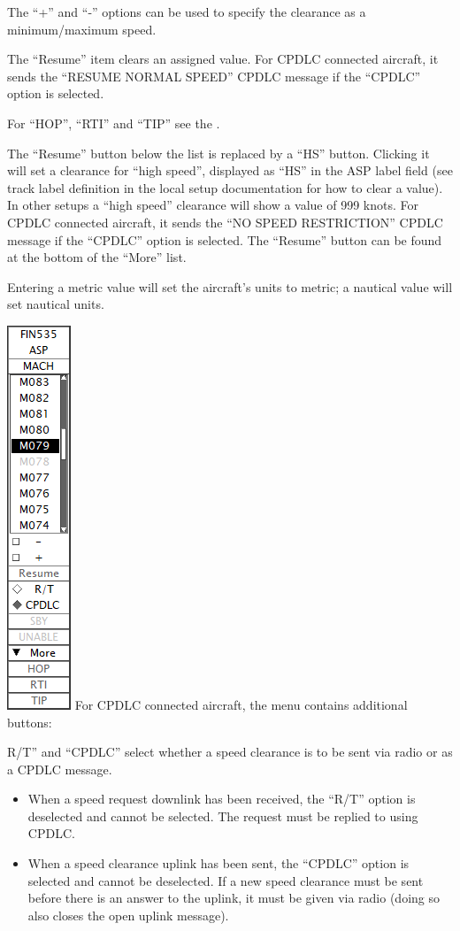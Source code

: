 \documentclass[11pt,a4paper]{memoir}
\begin{document}
The “+” and “-” options can be used to specify the clearance
as a minimum/maximum speed.

The “Resume” item clears an assigned value. For CPDLC connected aircraft, it sends the “RESUME NORMAL SPEED” CPDLC message if the “CPDLC” option is selected.

For “HOP”, “RTI” and “TIP” see the \textit{}.

The “Resume” button below the list is replaced by a “HS” button. Clicking it will set a clearance for “high speed”, displayed as “HS” in the ASP label field (see track label definition in the local setup documentation for how to clear a value). In other setups a “high speed” clearance will show a value of 999 knots. For CPDLC connected aircraft, it sends the “NO SPEED RESTRICTION” CPDLC message if the “CPDLC” option is selected. The “Resume” button can be found at the bottom of the “More” list.

Entering a metric value will set the aircraft’s units to metric; a nautical value will set
nautical units.

\includegraphics{img/aspmachdl.png}
For CPDLC connected aircraft, the menu contains additional buttons:

R/T” and “CPDLC” select whether a speed clearance is to be sent via radio or as a
CPDLC message.

\begin{itemize}
    \item When a speed request downlink has been received, the “R/T” option is deselected and cannot be selected. The request must be replied to using CPDLC.
    \item When a speed clearance uplink has been sent, the “CPDLC” option is selected and cannot be deselected. If a new speed clearance must be sent before there is an answer to the uplink, it must be given via radio (doing so also closes the open uplink message).
\end{itemize}
\end{document}
